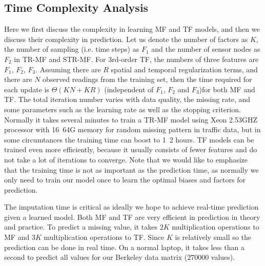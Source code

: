 \subsection{Time Complexity Analysis}
Here we first discuss the complexity in learning MF and TF models, and then we discuss their complexity in prediction.
Let us denote the number of factors as $K$, the number of sampling (i.e. time steps) as $F_1$ and the number of sensor nodes as $F_2$ in TR-MF and STR-MF. For 3rd-order TF, the numbers of three features are $F_1$, $F_2$, $F_3$.  
Assuming there are $R$ spatial and temporal regularization terms, and there are $N$ observed readings from the training set, then the time required for each update is $\Theta(KN + KR)$ (independent of $F_1$, $F_2$ and $F_3$)for both MF and TF.
The total iteration number varies with data quality, the missing rate, and some parameters such as the learning rate as well as the stopping criterion. Normally it takes several minutes to train a TR-MF  model using Xeon 2.53GHZ processor with 16~64G memory for random missing pattern in traffic data, but in some circumtances the training time can boost to 1~2 hours. TF models can be trained even more efficiently, because it usually consists of fewer features and do not take a lot of iterations to converge. 
Note that we would like to emphasize that the training time is not as important as the prediction time, as normally we only need to train our model once to learn the optimal biases and factors for prediction.

The imputation time is critical as ideally we hope to achieve real-time prediction given a learned model. 
Both MF and TF are very efficient in prediction in theory and practice.
To predict a missing value, it takes $2K$ multiplication operations to MF and $3K$ multiplication operations to TF.
Since $K$ is relatively small so the prediction can be done in real time.
On a normal laptop, it takes less than a second to predict all values for our Berkeley data matrix ($270000$ values).

